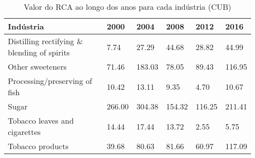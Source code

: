\begin{table}
\centering
\caption{Valor do RCA ao longo dos anos para cada indústria (CUB)}
\begin{tabular}{p{6cm}p{1.5cm}p{1.5cm}p{1.5cm}p{1.5cm}p{1.5cm}}
\toprule
                                  Indústria &   2000 &   2004 &   2008 &   2012 &   2016 \\
\midrule
Distilling rectifying \& blending of spirits &   7.74 &  27.29 &  44.68 &  28.82 &  44.99 \\
                           Other sweeteners &  71.46 & 183.03 &  78.05 &  89.43 & 116.95 \\
              Processing/preserving of fish &  10.42 &  13.11 &   9.35 &   4.70 &  10.67 \\
                                      Sugar & 266.00 & 304.38 & 154.32 & 116.25 & 211.41 \\
              Tobacco leaves and cigarettes &  14.44 &  17.44 &  13.72 &   2.55 &   5.75 \\
                           Tobacco products &  39.68 &  80.63 &  81.66 &  60.97 & 117.09 \\
\bottomrule
\end{tabular}
\end{table}
